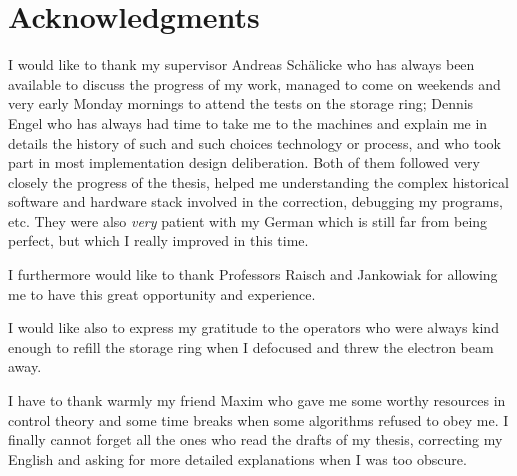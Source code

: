 
\chapter*{Acknowledgments}

I would like to thank my supervisor Andreas Schälicke who has always been available to discuss the progress of my work, managed to come on weekends and very early Monday mornings to attend the tests on the storage ring; Dennis Engel who has always had time to take me to the machines and explain me in details the history of such and such choices technology or process, and who took part in most implementation design deliberation. Both of them followed very closely the progress of the thesis, helped me understanding the complex historical software and hardware stack involved in the correction, debugging my programs, etc. They were also \textit{very} patient with my German which is still far from being perfect, but which I really improved in this time.

I furthermore would like to thank Professors Raisch and Jankowiak for allowing me to have this great opportunity and experience.

I would like also to express my gratitude to the operators who were always kind enough to refill the storage ring when I defocused and threw the electron beam away.

I have to thank warmly my friend Maxim who gave me some worthy resources in control theory and some time breaks when some algorithms refused to obey me. I finally cannot forget all the ones who read the drafts of my thesis, correcting my English and asking for more detailed explanations when I was too obscure.

